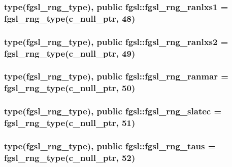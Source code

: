\hypertarget{classfgsl_aa3756069479859f5b94693230b23f052}{
\subsubsection[{fgsl\-\_\-rng\-\_\-ranlxs1}]{\setlength{\rightskip}{0pt plus 5cm}type({\bf fgsl\-\_\-rng\-\_\-type}), public fgsl\-::fgsl\-\_\-rng\-\_\-ranlxs1 = {\bf fgsl\-\_\-rng\-\_\-type}(c\-\_\-null\-\_\-ptr, 48)}}\label{classfgsl_aa3756069479859f5b94693230b23f052}
\hypertarget{classfgsl_a961029daf705e420d4626038ceffbdc5}{
\subsubsection[{fgsl\-\_\-rng\-\_\-ranlxs2}]{\setlength{\rightskip}{0pt plus 5cm}type({\bf fgsl\-\_\-rng\-\_\-type}), public fgsl\-::fgsl\-\_\-rng\-\_\-ranlxs2 = {\bf fgsl\-\_\-rng\-\_\-type}(c\-\_\-null\-\_\-ptr, 49)}}\label{classfgsl_a961029daf705e420d4626038ceffbdc5}
\hypertarget{classfgsl_a099ffd8b436045a9bd570027a1406df4}{
\subsubsection[{fgsl\-\_\-rng\-\_\-ranmar}]{\setlength{\rightskip}{0pt plus 5cm}type({\bf fgsl\-\_\-rng\-\_\-type}), public fgsl\-::fgsl\-\_\-rng\-\_\-ranmar = {\bf fgsl\-\_\-rng\-\_\-type}(c\-\_\-null\-\_\-ptr, 50)}}\label{classfgsl_a099ffd8b436045a9bd570027a1406df4}
\hypertarget{classfgsl_aa8d0035b0617f463167b9fce7aeedd26}{
\subsubsection[{fgsl\-\_\-rng\-\_\-slatec}]{\setlength{\rightskip}{0pt plus 5cm}type({\bf fgsl\-\_\-rng\-\_\-type}), public fgsl\-::fgsl\-\_\-rng\-\_\-slatec = {\bf fgsl\-\_\-rng\-\_\-type}(c\-\_\-null\-\_\-ptr, 51)}}\label{classfgsl_aa8d0035b0617f463167b9fce7aeedd26}
\hypertarget{classfgsl_a9fe9a6cae0f833d90b9c22d644165758}{
\subsubsection[{fgsl\-\_\-rng\-\_\-taus}]{\setlength{\rightskip}{0pt plus 5cm}type({\bf fgsl\-\_\-rng\-\_\-type}), public fgsl\-::fgsl\-\_\-rng\-\_\-taus = {\bf fgsl\-\_\-rng\-\_\-type}(c\-\_\-null\-\_\-ptr, 52)}}\label{classfgsl_a9fe9a6cae0f833d90b9c22d644165758}
